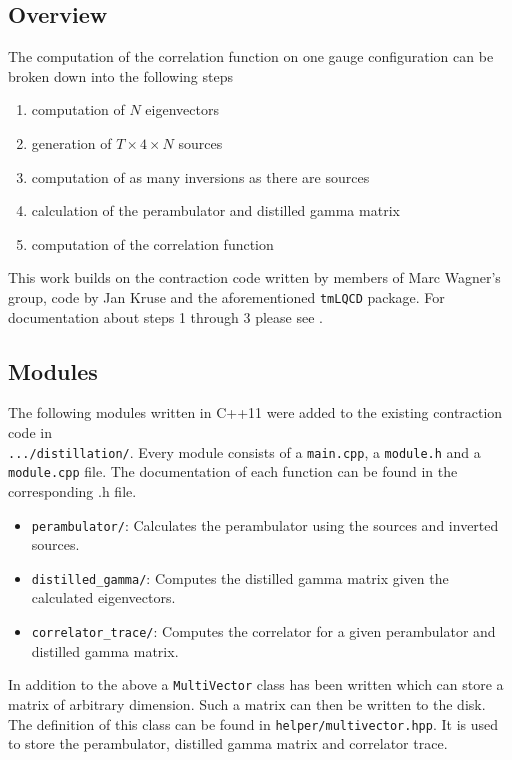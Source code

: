 \subsection{Overview}
    The computation of the correlation function on one gauge configuration can be broken down into the following steps
    \begin{enumerate}
        \item computation of $N$ eigenvectors
        \item generation of $T \times 4 \times N$ sources
        \item computation of as many inversions as there are sources
        \item calculation of the perambulator and distilled gamma matrix
        \item computation of the correlation function
    \end{enumerate}
    This work builds on the contraction code written by members of Marc Wagner's group, code by Jan Kruse and the aforementioned \verb+tmLQCD+ package. For documentation about steps 1 through 3 please see \cite{bachelor_thesis_jan}.



\subsection{Modules}
    The following modules written in C++11 were added to the existing contraction code in \\\verb+.../distillation/+. Every module consists of a \verb+main.cpp+, a \verb+module.h+ and a \verb+module.cpp+ file. The documentation of each function can be found in the corresponding .h file.  
    \begin{itemize}
        \item \verb+perambulator/+: Calculates the perambulator using the sources and inverted sources.
        \item \verb+distilled_gamma/+: Computes the distilled gamma matrix given the calculated eigenvectors.
        \item \verb+correlator_trace/+: Computes the correlator for a given perambulator and distilled gamma matrix.
    \end{itemize}
    
    \noindent
    In addition to the above a \verb+MultiVector+ class has been written which can store a matrix of arbitrary dimension. Such a matrix can then be written to the disk. The definition of this class can be found in \verb+helper/multivector.hpp+. It is used to store the perambulator, distilled gamma matrix and correlator trace.
    
